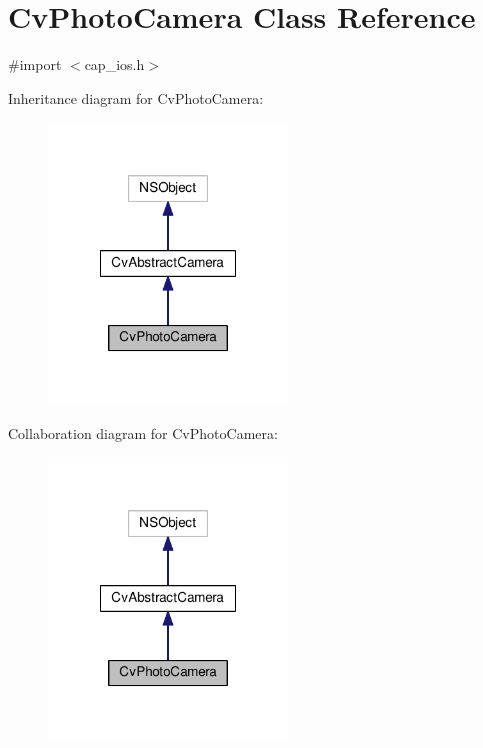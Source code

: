 \hypertarget{interfaceCvPhotoCamera}{\section{Cv\-Photo\-Camera Class Reference}
\label{interfaceCvPhotoCamera}
}


{\ttfamily \#import $<$cap\-\_\-ios.\-h$>$}



Inheritance diagram for Cv\-Photo\-Camera\-:\nopagebreak
\begin{figure}[H]
\begin{center}
\leavevmode
\includegraphics[width=180pt]{interfaceCvPhotoCamera__inherit__graph}
\end{center}
\end{figure}


Collaboration diagram for Cv\-Photo\-Camera\-:\nopagebreak
\begin{figure}[H]
\begin{center}
\leavevmode
\includegraphics[width=180pt]{interfaceCvPhotoCamera__coll__graph}
\end{center}
\end{figure}
